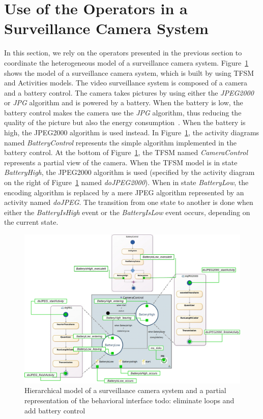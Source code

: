 \section{Use of the Operators in a Surveillance Camera System}
In this section, we rely on the operators presented in the previous section to coordinate the heterogeneous model of a surveillance camera system. Figure~\ref{fig:camerasystem} shows the model of a surveillance camera system, which is built by using TFSM and Activities models. The video surveillance system is composed of a camera and a battery control. The camera takes pictures by using either the \emph{JPEG2000} or \emph{JPG} algorithm and is powered by a battery. When the battery is low, the battery control makes the camera use the \emph{JPG} algorithm, thus reducing the quality of the picture but also the energy consumption~\cite{encodingcomparison}. When the battery is high, the JPEG2000 algorithm is used instead. In Figure~\ref{fig:camerasystem}, the activity diagrams named \emph{BatteryControl} represents the simple algorithm implemented in the battery control. At the bottom of Figure~\ref{fig:camerasystem}, the TFSM named \emph{CameraControl} represents a partial view of the camera. When the TFSM model is in state \emph{BatteryHigh}, the JPEG2000 algorithm is used (specified by the activity diagram on the right of Figure~\ref{fig:camerasystem} named \emph{doJPEG2000}). When in state \emph{BatteryLow}, the encoding algorithm is replaced by a mere JPEG algorithm represented by an activity named \emph{doJPEG}. The transition from one state to another is done when either the \emph{BatteryIsHigh} event or the \emph{BatteryIsLow} event occurs, depending on the current state.	   


\begin{figure}
	\center
	\includegraphics[width=1\columnwidth]{examples/figs/picmodels.pdf}
	\caption{Hierarchical model of a surveillance camera system and a partial representation of the behavioral interface todo: eliminate loops and add battery control}
	\label{fig:camerasystem}
\end{figure}
 

